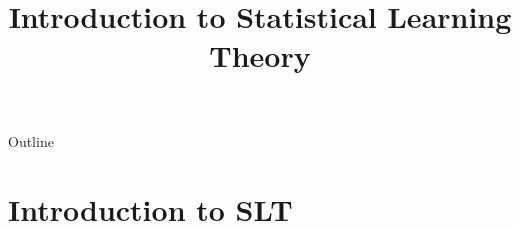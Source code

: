 
%
%
%
%



\title[Introduction to Statistical Learning Theory]{Introduction to Statistical Learning Theory}

%

\begin{frame}[plain]
  \titlepage
\end{frame}

\begin{frame}{Outline}
  \tableofcontents
\end{frame}

\section{Introduction to SLT}

